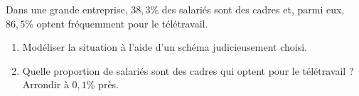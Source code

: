 \begin{exo}{}
	Dans une grande entreprise, $38,3$\% des salariés sont des cadres et, parmi eux, $86,5$\% optent fréquemment pour le télétravail.
	\begin{enumerate}
		\item Modéliser la situation à l'aide d'un schéma judicieusement choisi.
		\item Quelle proportion de salariés sont des cadres qui optent pour le télétravail ? Arrondir à $0,1$\% près.
	\end{enumerate}
\end{exo}
